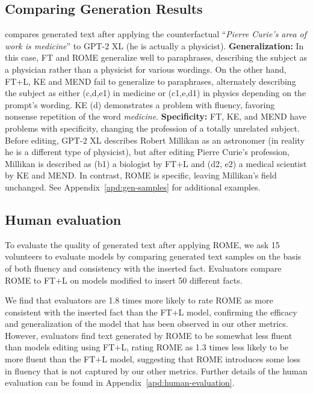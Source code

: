 \subsection{Comparing Generation Results}
\label{subsec:qualitative-analysis}


 compares generated text after applying the counterfactual ``\textit{Pierre Curie's area of work is medicine}'' to GPT-2 XL (he is actually a physicist). \textbf{Generalization:} In this case, FT and ROME generalize well to paraphrases, describing the subject as a physician rather than a physicist for various wordings.  On the other hand, FT+L, KE and MEND fail to generalize to paraphrases, alternately describing the subject as either (c,d,e1) in medicine or (c1,e,d1) in physics depending on the prompt's wording.  KE (d) demonstrates a problem with fluency, favoring nonsense repetition of the word \emph{medicine}. \textbf{Specificity:} FT, KE, and MEND have problems with specificity, changing the profession of a totally unrelated subject.  Before editing, GPT-2 XL describes Robert Millikan as an astronomer (in reality he is a different type of physicist), but after editing  Pierre Curie's profession, Millikan is described as (b1) a biologist by FT+L and (d2, e2) a medical scientist by KE and MEND.  In contrast, ROME is specific, leaving Millikan's field unchanged. See 
 Appendix~\ref{apd:gen-samples} for additional examples. 

\subsection{Human evaluation}

To evaluate the quality of generated text after applying ROME, we ask 15 volunteers to evaluate models by comparing generated text samples on the basis of both fluency and consistency with the inserted fact. Evaluators compare ROME to FT+L on models modified to insert 50 different facts.

We find that evaluators are 1.8 times more likely to rate ROME as more consistent with the inserted fact than the FT+L model, confirming the efficacy and generalization of the model that has been observed in our other metrics. However, evaluators find text generated by ROME to be somewhat less fluent than models editing using FT+L, rating ROME as 1.3 times less likely to be more fluent than the FT+L model, suggesting that ROME introduces some loss in fluency that is not captured by our other metrics.  Further details of the human evaluation can be found in Appendix~\ref{apd:human-evaluation}.


